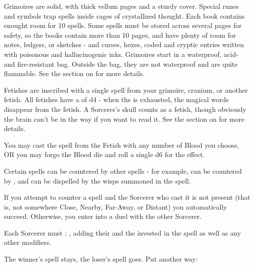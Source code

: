 {

Grimoires are solid, with thick vellum pages and a sturdy cover. Special runes and symbols trap spells inside cages of crystallized thought. Each book contains enought room for 10 spells. Some spells must be stored across several pages for safety, so the books contain more than 10 pages, and have
plenty of room for notes, ledgers, or sketches - and curses, hexes, coded and cryptic entries written with poisonous and hallucinogenic inks. Grimoires start in a waterproof, acid- and fire-resistant bag. Outside the bag, they are not waterproof and are quite flammable. See the section on
 for more details.



Fetishes are inscribed with a single spell from your grimoire, cranium, or another fetish.  All fetishes have a \UD of d4 - when the \UD is exhausted, the magical words disappear from the fetish.  A Sorcerer's skull counts as a fetish, though obviously the brain can't be in the way if you want to read
it.  See the section on  for more details.

You may cast the spell from the Fetish with any number of Blood you choose, OR you may forgo the Blood die and roll a single d6 for the effect.


Certain spells can be countered by other spells - for example,
 can be countered by
, and
 can be dispelled by the wisps
summoned in the  spell. 

If you attempt to counter a spell and the Sorcerer who cast it is not
present (that is, not somewhere Close, Nearby, Far-Away, or Distant) you
automatically succeed.  Otherwise, you enter into a duel with the other
Sorcerer.

Each Sorcerer must \RB : \INT, adding their \LVL and the \DICE invested in
the spell as well as any other modifiers.  



The winner's spell stays, the loser's spell goes.  Put another way: 

}
